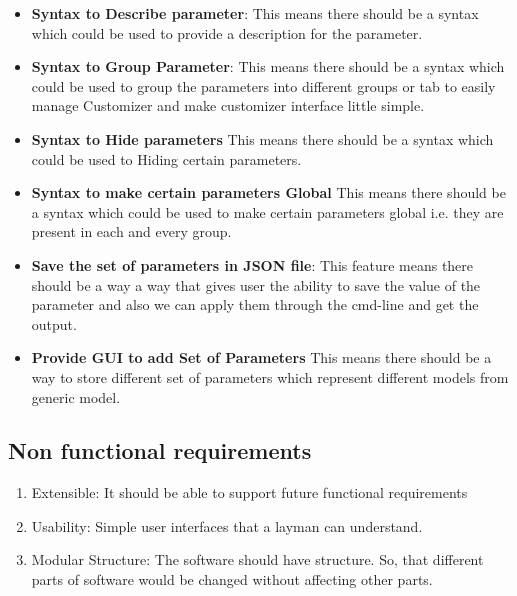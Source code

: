 \begin{itemize}
\begin{enumerate}
    \end{enumerate}
    \item {\bf Syntax to Describe parameter}:
        This means there should be a syntax which could be used to provide a description for the parameter.
    \item \textbf{Syntax to Group Parameter}:
        This means there should be a syntax which could be used to group the parameters into different groups or tab to easily manage Customizer and make customizer interface little simple.
    \item \textbf{Syntax to Hide parameters}
        This means there should be a syntax which could be used to Hiding certain parameters.
    \item \textbf{Syntax to make certain parameters Global}
        This means there should be a syntax which could be used to make certain parameters global i.e. they are present in each and every group.
    \item \textbf{Save the set of parameters in JSON file}:
    This feature means there should be a way a way that gives user the ability to save the value of the parameter and also we can apply them through the cmd-line and get the output.
   
    \item \textbf{Provide GUI to add Set of Parameters}
        This means there should be a way to store different set of parameters which represent different models from generic model.
    \end{itemize}
\subsection{Non functional requirements}
\begin{enumerate}
    \item Extensible: It should be able to support future functional requirements
    \item Usability: Simple user interfaces that a layman can understand.
    \item Modular Structure: The software should have  structure. So, that different parts of software would be changed without affecting other parts.
 
\end{enumerate}

